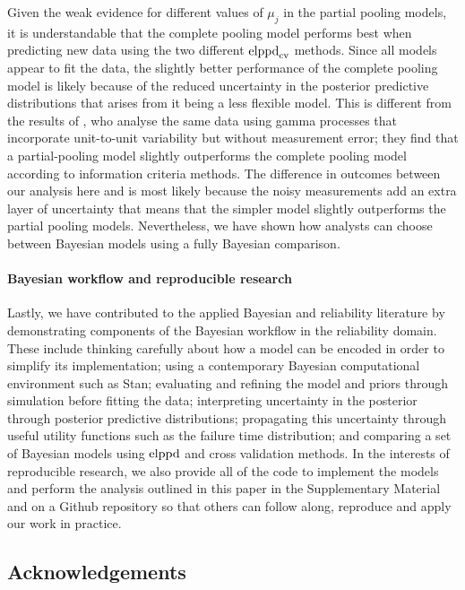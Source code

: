 \documentclass{article}
\begin{document}
Given the weak evidence for different values of $\mu_j$ in the partial pooling models, it is understandable that the complete pooling model performs best when predicting new data using the two different $\hbox{elppd}_\text{cv}$ methods. Since all models appear to fit the data, the slightly better performance of the complete pooling model is likely because of the reduced uncertainty in the posterior predictive distributions that arises from it being a less flexible model. This is different from the results of \citet{rodriguez-picon_degradation_2018}, who analyse the same data using gamma processes that incorporate unit-to-unit variability but without measurement error; they find that a partial-pooling model slightly outperforms the complete pooling model according to information criteria methods. The difference in outcomes between our analysis here and \citet{rodriguez-picon_degradation_2018} is most likely because the noisy measurements add an extra layer of uncertainty that means that the simpler model slightly outperforms the partial pooling models. Nevertheless, we have shown how analysts can choose between Bayesian models using a fully Bayesian comparison.

\paragraph*{Bayesian workflow and reproducible research} Lastly, we have contributed to the applied Bayesian and reliability literature by demonstrating components of the Bayesian workflow in the reliability domain. These include thinking carefully about how a model can be encoded in order to simplify its implementation; using a contemporary Bayesian computational environment such as Stan; evaluating and refining the model and priors through simulation before fitting the data; interpreting uncertainty in the posterior through posterior predictive distributions; propagating this uncertainty through useful utility functions such as the failure time distribution; and comparing a set of Bayesian models using $\hbox{elppd}$ and cross validation methods. In the interests of reproducible research, we also provide all of the code to implement the models and perform the analysis outlined in this paper in the Supplementary Material and on a Github repository so that others can follow along, reproduce and apply our work in practice.

\newpage

\subsection*{Acknowledgements}
\end{document}
